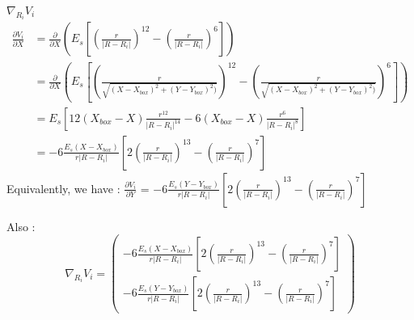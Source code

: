 \documentclass{article}
\begin{document}
$\nabla_{R_i} V_i$
\begin{align*}
    \frac{\partial V_i}{\partial X} &= \frac{\partial}{\partial X} \left( E_s \left[ \left( \frac{r}{\lvert R - R_i \rvert} \right)^{12} - \left( \frac{r}{\lvert R - R_i \rvert} \right) ^6 \right] \right) \\
    &= \frac{\partial}{\partial X} \left( E_s \left[ \left( \frac{r}{\sqrt{( X-X_{box})^2 + (Y-Y_{box})^2)}} \right)^{12} - \left( \frac{r}{\sqrt{( X-X_{box})^2 + (Y-Y_{box})^2)}} \right) ^6 \right] \right) \\
    &= E_s\left[ 12(X_{box}-X)\frac{r^{12}}{\lvert R - R_i\rvert^{14}} - 6(X_{box}-X)\frac{r^6}{\lvert R-R_i\rvert^8} \right] \\
    &= -6 \frac{E_s (X-X_{box})}{r \lvert R - R_i \rvert } \left[ 2 \left( \frac{r}{\lvert R-R_i\rvert} \right)^{13} - \left( \frac{r}{\lvert R-R_i\rvert}\right)^7 \right] 
\end{align*}
Equivalently, we have : $\frac{\partial V_i}{\partial Y}$ = $ -6 \frac{E_s (Y-Y_{box})}{r \lvert R - R_i \rvert } \left[ 2 \left( \frac{r}{\lvert R-R_i\rvert} \right)^{13} - \left( \frac{r}{\lvert R-R_i\rvert}\right)^7 \right]$

Also : 
\begin{equation*}
    \boxed{\nabla_{R_i} V_i = \begin{pmatrix}
        -6 \frac{E_s (X-X_{box})}{r \lvert R - R_i \rvert } \left[ 2 \left( \frac{r}{\lvert R-R_i\rvert} \right)^{13} - \left( \frac{r}{\lvert R-R_i\rvert}\right)^7 \right] \\
        -6 \frac{E_s (Y-Y_{box})}{r \lvert R - R_i \rvert } \left[ 2 \left( \frac{r}{\lvert R-R_i\rvert} \right)^{13} - \left( \frac{r}{\lvert R-R_i\rvert}\right)^7 \right]
    \end{pmatrix}}
\end{equation*}
\end{document}
